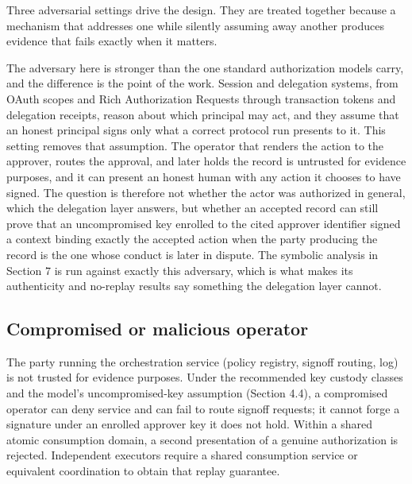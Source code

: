 \documentclass[11pt]{article}
\begin{document}
Three adversarial settings drive the design. They are treated together because a
mechanism that addresses one while silently assuming away another produces
evidence that fails exactly when it matters.

The adversary here is stronger than the one standard authorization models carry,
and the difference is the point of the work. Session and delegation systems, from
OAuth scopes and Rich Authorization Requests through transaction tokens and
delegation receipts, reason about which principal may act, and they assume that an
honest principal signs only what a correct protocol run presents to it. This
setting removes that assumption. The operator that renders the action to the
approver, routes the approval, and later holds the record is untrusted for
evidence purposes, and it can present an honest human with any action it chooses
to have signed. The question is therefore not whether the actor was authorized in
general, which the delegation layer answers, but whether an accepted record can
still prove that an uncompromised key enrolled to the cited approver identifier
signed a context binding exactly the accepted action when the party producing the
record is the one whose conduct is later in dispute. The symbolic analysis in
Section 7 is run against exactly this adversary, which is what makes its
authenticity and no-replay results say something the delegation layer cannot.

\subsection{Compromised or malicious operator}

The party running the orchestration service (policy registry, signoff routing,
log) is not trusted for evidence purposes. Under the recommended key custody
classes and the model's uncompromised-key assumption (Section 4.4), a compromised
operator can deny service and can fail to route signoff requests; it cannot forge
a signature under an enrolled approver key it does not hold. Within a shared
atomic consumption domain, a second presentation of a genuine authorization is
rejected. Independent executors require a shared consumption service or equivalent
coordination to obtain that replay guarantee.
\end{document}
